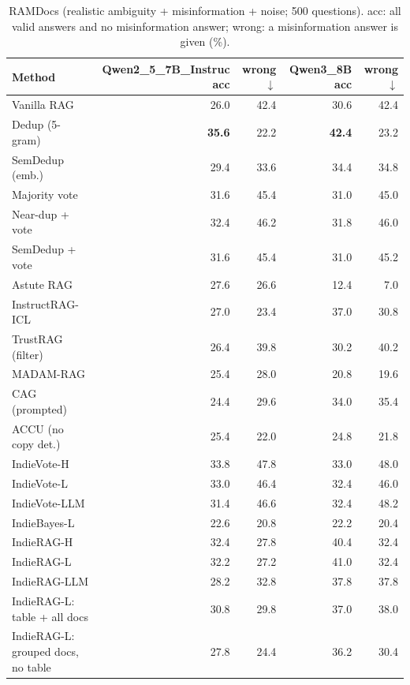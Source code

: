 \begin{table}[tbp]
\centering
\small
\caption{RAMDocs (realistic ambiguity + misinformation + noise; 500 questions). acc: all valid answers and no misinformation answer; wrong: a misinformation answer is given (\%).}
\label{tab:ramdocs}
\setlength{\tabcolsep}{4pt}
\begin{tabular}{lrrrr}
\toprule
Method & Qwen2\_5\_7B\_Instruc acc & wrong$\downarrow$ & Qwen3\_8B acc & wrong$\downarrow$ \\
\midrule
Vanilla RAG & 26.0 & 42.4 & 30.6 & 42.4 \\
Dedup (5-gram) & \textbf{35.6} & 22.2 & \textbf{42.4} & 23.2 \\
SemDedup (emb.) & 29.4 & 33.6 & 34.4 & 34.8 \\
Majority vote & 31.6 & 45.4 & 31.0 & 45.0 \\
Near-dup + vote & 32.4 & 46.2 & 31.8 & 46.0 \\
SemDedup + vote & 31.6 & 45.4 & 31.0 & 45.2 \\
Astute RAG & 27.6 & 26.6 & 12.4 & 7.0 \\
InstructRAG-ICL & 27.0 & 23.4 & 37.0 & 30.8 \\
TrustRAG (filter) & 26.4 & 39.8 & 30.2 & 40.2 \\
MADAM-RAG & 25.4 & 28.0 & 20.8 & 19.6 \\
CAG (prompted) & 24.4 & 29.6 & 34.0 & 35.4 \\
ACCU (no copy det.) & 25.4 & 22.0 & 24.8 & 21.8 \\
\midrule
IndieVote-H & 33.8 & 47.8 & 33.0 & 48.0 \\
IndieVote-L & 33.0 & 46.4 & 32.4 & 46.0 \\
IndieVote-LLM & 31.4 & 46.6 & 32.4 & 48.2 \\
IndieBayes-L & 22.6 & 20.8 & 22.2 & 20.4 \\
IndieRAG-H & 32.4 & 27.8 & 40.4 & 32.4 \\
IndieRAG-L & 32.2 & 27.2 & 41.0 & 32.4 \\
IndieRAG-LLM & 28.2 & 32.8 & 37.8 & 37.8 \\
IndieRAG-L: table + all docs & 30.8 & 29.8 & 37.0 & 38.0 \\
IndieRAG-L: grouped docs, no table & 27.8 & 24.4 & 36.2 & 30.4 \\
\bottomrule
\end{tabular}
\end{table}
